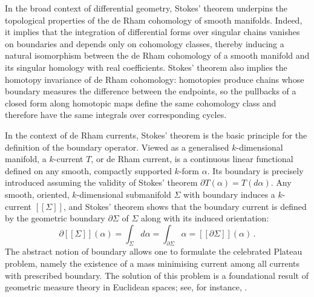 \documentclass[dvipsnames]{amsart}
\theoremstyle{definition}
\theoremstyle{definition}
\numberwithin{equation}{section}
\begin{document}
In the broad context of differential geometry, Stokes' theorem underpins the topological properties of the de Rham cohomology of smooth manifolds. Indeed, it implies that the integration of differential forms over singular chains vanishes on boundaries and depends only on cohomology classes, thereby inducing a natural isomorphism between the de Rham cohomology of a smooth manifold and its singular homology with real coefficients. Stokes’ theorem also implies the homotopy invariance of de Rham cohomology: homotopies produce chains whose boundary measures the difference between the endpoints, so the pullbacks of a closed form along homotopic maps define the same cohomology class and therefore have the same integrals over corresponding cycles.

In the context of de Rham currents, Stokes' theorem is the basic principle for the definition of the boundary operator. Viewed as a generalised $k$-dimensional manifold, a $k$-current $T$, or de Rham current, is a continuous linear functional defined on any smooth, compactly supported $k$-form $\alpha$. Its boundary is precisely introduced assuming the validity of Stokes' theorem $\partial T(\alpha)=T(d\alpha)$. Any smooth, oriented, $k$-dimensional submanifold $\Sigma$ with boundary induces a $k$-current $[[\Sigma]]$, and Stokes' theorem shows that the boundary current is defined by the geometric boundary $\partial\Sigma$ of $\Sigma$ along with its induced orientation: 
\begin{equation*}
\partial [[\Sigma]](\alpha)=\int_{\Sigma}d\alpha=\int_{\partial\Sigma}\alpha = [[\partial \Sigma]](\alpha)\,.
\end{equation*}
The abstract notion of boundary allows one to formulate the celebrated Plateau problem, namely the existence of a mass minimising current among all currents with prescribed boundary. The solution of this problem is a foundational result of geometric measure theory in Euclidean spaces; see, for instance, \cite{Federer69,Morgan2016-bk}.
\end{document}

